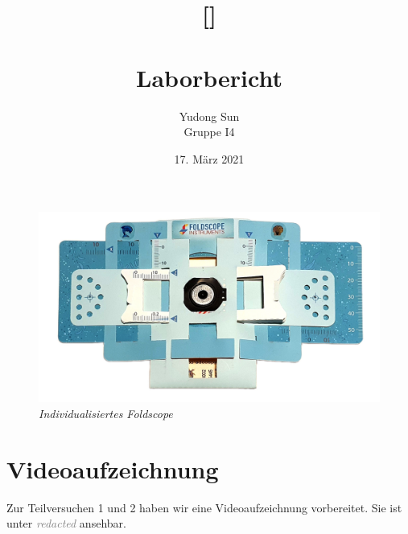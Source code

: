 \documentclass[11pt]{article} %
\title{[\versuch{}] \\ \versuchLang \\ Laborbericht}
\author{Yudong Sun\\Gruppe I4\\%
	{\smaller{2}{In Zusammenarbeit mit Schramm [Gruppe J4]}}}
\date{17. März 2021}
\makeatletter
\newcommand{\nonum}[0]{%
        \let\@oldseccntformat\@seccntformat %
        \renewcommand\@seccntformat[1]{}%
        }
\newcommand{\resnum}[0]{\let\@seccntformat\@oldseccntformat}
\makeatother
\begin{document}


	\maketitle
	\thispagestyle{empty}

	\nonum

	\begin{center}
		\vfill
		\begin{figure}[h]
			\centering%
			\includegraphics[width=\textwidth]{cover.jpg}
			\captionsetup{labelformat=empty}
			\caption{\textit{Individualisiertes Foldscope}}
		\end{figure}
		\vfill
	\end{center}

\newpage

\tableofcontents
	\renewcommand*{\bibfont}{\raggedright}
	\hypersetup{urlcolor=gray}
	\printbibliography

\newpage



\section{Videoaufzeichnung}
     Zur Teilversuchen 1 und 2 haben wir eine Videoaufzeichnung vorbereitet. Sie ist unter \textcolor{gray}{\textit{redacted}} ansehbar. 

\resnum
\newpage
\begin{appendices}
	
\end{appendices}
\end{document}
